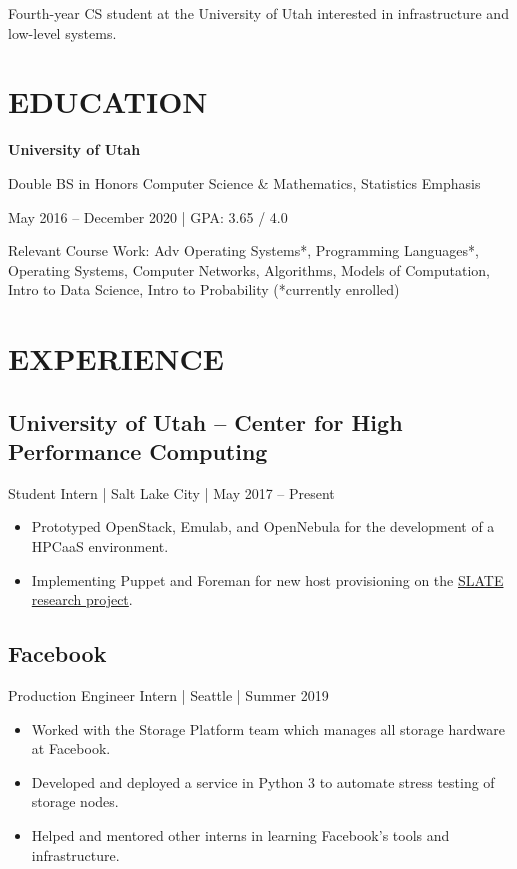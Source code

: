 \documentclass[10pt, letterpaper]{resume}
\begin{document}
\maketitle

{\centering
  Fourth-year CS student at the University of Utah interested in infrastructure and low-level systems.
  \par
}

\section{EDUCATION}
{\centering
  \textbf{University of Utah}

  Double BS in Honors Computer Science \& Mathematics, Statistics Emphasis

  May 2016 -- December 2020 | GPA: 3.65 / 4.0
  \par
}
\vspace{10pt}
{\selectfont Relevant Course Work:}
Adv Operating Systems*, Programming Languages*, Operating Systems, Computer Networks, Algorithms, Models of Computation, Intro to Data Science, Intro to Probability {\footnotesize(*currently enrolled)}

\section{EXPERIENCE}
\subsection{University of Utah -- Center for High Performance Computing}
Student Intern | Salt Lake City | May 2017 -- Present
\begin{itemize}
  \item Prototyped OpenStack, Emulab, and OpenNebula for the development of a HPCaaS environment.
  \item Implementing Puppet and Foreman for new host provisioning on the \href{https://slateci.io}{SLATE research project}.
\end{itemize}

\subsection{Facebook}
Production Engineer Intern | Seattle | Summer 2019
\begin{itemize}
  \item Worked with the Storage Platform team which manages all storage hardware at Facebook.
  \item Developed and deployed a service in Python 3 to automate stress testing of storage nodes.
  \item Helped and mentored other interns in learning Facebook's tools and infrastructure.
\end{itemize}
\end{document}

